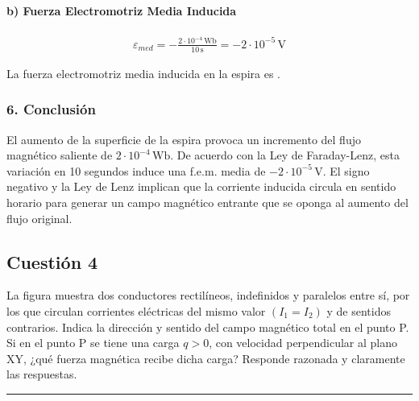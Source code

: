 \paragraph*{b) Fuerza Electromotriz Media Inducida}
\begin{gather}
    \varepsilon_{med} = - \frac{2 \cdot 10^{-4} \, \text{Wb}}{10 \, \text{s}} = -2 \cdot 10^{-5} \, \text{V}
\end{gather}
\begin{cajaresultado}
    La fuerza electromotriz media inducida en la espira es .
\end{cajaresultado}

\subsubsection*{6. Conclusión}
\begin{cajaconclusion}
El aumento de la superficie de la espira provoca un incremento del flujo magnético saliente de $2 \cdot 10^{-4} \, \text{Wb}$. De acuerdo con la Ley de Faraday-Lenz, esta variación en 10 segundos induce una f.e.m. media de $-2 \cdot 10^{-5} \, \text{V}$. El signo negativo y la Ley de Lenz implican que la corriente inducida circula en sentido horario para generar un campo magnético entrante que se oponga al aumento del flujo original.
\end{cajaconclusion}

\newpage

\subsection{Cuestión 4}
\label{subsec:C4_2021_jun_ord}

\begin{cajaenunciado}
La figura muestra dos conductores rectilíneos, indefinidos y paralelos entre sí, por los que circulan corrientes eléctricas del mismo valor $(I_1 = I_2)$ y de sentidos contrarios. Indica la dirección y sentido del campo magnético total en el punto P. Si en el punto P se tiene una carga $q > 0$, con velocidad perpendicular al plano XY, ¿qué fuerza magnética recibe dicha carga? Responde razonada y claramente las respuestas.
\end{cajaenunciado}
\hrule

